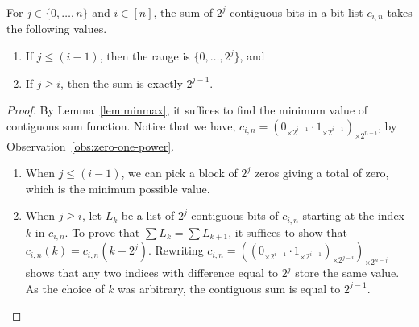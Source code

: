 \begin{lemma}
\label{lem:shiftpower}
 For  $j\in\{0,\dots,n\}$ and $i \in [n]$, the sum of $2^j$ contiguous bits in a bit list $c_{i,n}$ takes the following values.
\begin{enumerate}
\item
\label{enum:shiftpower-one}
If $j \leq (i-1)$, then the range is $\{0, \dots,2^j \}$, and
\item
\label{enum:shiftpower-two}
If $j\geq i$, then the sum is exactly $2^{j-1}$.
\end{enumerate}
\end{lemma}
\begin{proof}
 By Lemma~\ref{lem:minmax}, it suffices to find the minimum value of contiguous sum function. Notice that we have, $c_{i,n}= (0_{\times 2^{i-1}} \cdot 1_{\times 2^{i-1}})_{\times 2^{n-i}}$, by Observation~\ref{obs:zero-one-power}.
 \begin{enumerate}
 \item
 When $j\leq (i-1)$, we can pick a block of $2^j$ zeros giving a total of zero, which is the minimum possible value.
 \item
 When $j\geq i$, let $L_k$ be a list of $2^j$ contiguous bits of $c_{i,n}$ starting at the index $k$ in $c_{i,n}$. To prove that $\sum L_k = \sum L_{k+1} $, it suffices to show that $c_{i,n}(k)=c_{i,n}(k+2^j)$. Rewriting
 $c_{i,n}=((0_{\times 2^{i-1}}\cdot 1_{\times 2^{i-1}})_{\times 2^{j-i}})_{\times 2^{n-j}}$ shows that any two indices with difference equal to $2^j$ store the same value. As the choice of $k$ was arbitrary, the contiguous sum is equal to $2^{j-1}$.
 \end{enumerate} 
\end{proof}

